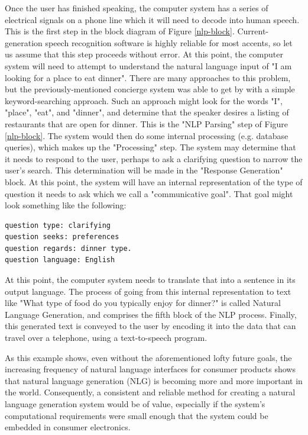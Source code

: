 Once the user has finished speaking, the computer system has a series of electrical signals on
a phone line which it will need to decode into human speech.  This is the first step
in the block diagram of Figure \ref{nlp-block}.  Current-generation speech recognition
software is highly reliable for most accents, so let us assume that this step proceeds without
error.  At this point, the computer system will need to attempt to understand the natural
language input of "I am looking for a place to eat dinner".  There are many approaches
to this problem, but the previously-mentioned concierge system was able to get by with
a simple keyword-searching approach.  Such an approach might look for the words "I",
"place", "eat", and "dinner", and determine that the speaker desires a listing of restaurants that
are open for dinner.  This is the "NLP Parsing" step of Figure \ref{nlp-block}.  The system would
then do some internal processing (e.g. database queries), which makes up the "Processing"
step.  The system may determine that it needs to respond to the user, perhaps to ask a
clarifying question to narrow the user's search.  This determination will be made in the
"Response Generation" block.  At this point, the system will have an internal representation
of the type of question it needs to ask which we call a "communicative goal".  That goal might
look something like the following:
\begin{verbatim}
question type: clarifying
question seeks: preferences
question regards: dinner type.
question language: English
\end{verbatim}

At this point, the computer system needs to translate that into a sentence in its output
language.  The process of going from this internal representation to text like
"What type of food do you typically enjoy for dinner?" is called Natural Language Generation,
and comprises the fifth block of the NLP process.  Finally, this generated text is conveyed to
the user by encoding it into the data that can travel over a telephone, using a text-to-speech
program.

As this example shows, even without the aforementioned lofty future goals,
the increasing frequency of natural language interfaces for consumer
products shows that natural language generation (NLG) is becoming more and more important
in the world.  Consequently, a consistent and reliable method for creating a natural
language generation system would be of value, especially if the system's
computational requirements were small enough that the system could be embedded
in consumer electronics.

